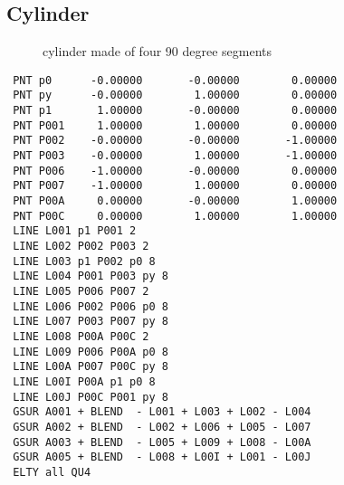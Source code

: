 \documentclass{article}
\begin{document}
\begin{appendix}
\subsection{\label{Cylinder}Cylinder}
\begin{figure}[h]
\caption{\label{cylinder made of four 90 degree segments}cylinder made of four 90 degree segments}
\end{figure}
\begin{verbatim}
 PNT p0      -0.00000       -0.00000        0.00000 
 PNT py      -0.00000        1.00000        0.00000 
 PNT p1       1.00000       -0.00000        0.00000 
 PNT P001     1.00000        1.00000        0.00000 
 PNT P002    -0.00000       -0.00000       -1.00000 
 PNT P003    -0.00000        1.00000       -1.00000 
 PNT P006    -1.00000       -0.00000        0.00000 
 PNT P007    -1.00000        1.00000        0.00000 
 PNT P00A     0.00000       -0.00000        1.00000 
 PNT P00C     0.00000        1.00000        1.00000 
 LINE L001 p1 P001 2              
 LINE L002 P002 P003 2              
 LINE L003 p1 P002 p0 8              
 LINE L004 P001 P003 py 8              
 LINE L005 P006 P007 2              
 LINE L006 P002 P006 p0 8              
 LINE L007 P003 P007 py 8              
 LINE L008 P00A P00C 2              
 LINE L009 P006 P00A p0 8              
 LINE L00A P007 P00C py 8              
 LINE L00I P00A p1 p0 8              
 LINE L00J P00C P001 py 8              
 GSUR A001 + BLEND  - L001 + L003 + L002 - L004 
 GSUR A002 + BLEND  - L002 + L006 + L005 - L007 
 GSUR A003 + BLEND  - L005 + L009 + L008 - L00A 
 GSUR A005 + BLEND  - L008 + L00I + L001 - L00J 
 ELTY all QU4 
\end{verbatim}


\end{appendix}
\end{document}
